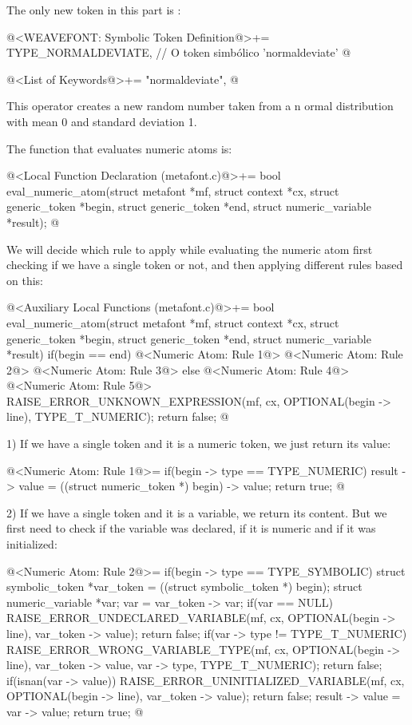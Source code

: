 The only new token in this part is :

\iniciocodigo
@<WEAVEFONT: Symbolic Token Definition@>+=
TYPE_NORMALDEVIATE,   // O token simbólico 'normaldeviate'
@
\fimcodigo

\iniciocodigo
@<List of Keywords@>+=
"normaldeviate",
@
\fimcodigo

This operator creates a new random number taken from a n ormal
distribution with mean 0 and standard deviation 1.

The function that evaluates numeric atoms is:

\iniciocodigo
@<Local Function Declaration (metafont.c)@>+=
bool eval_numeric_atom(struct metafont *mf, struct context *cx,
                       struct generic_token *begin,
                       struct generic_token *end,
                       struct numeric_variable *result);
@
\fimcodigo

We will decide which rule to apply while evaluating the numeric atom
first checking if we have a single token or not, and then applying
different rules based on this:

\iniciocodigo
@<Auxiliary Local Functions (metafont.c)@>+=
bool eval_numeric_atom(struct metafont *mf, struct context *cx,
                       struct generic_token *begin,
                       struct generic_token *end,
                       struct numeric_variable *result){
  if(begin == end){
    @<Numeric Atom: Rule 1@>
    @<Numeric Atom: Rule 2@>
    @<Numeric Atom: Rule 3@>
  }
  else{
    @<Numeric Atom: Rule 4@>
    @<Numeric Atom: Rule 5@>
  }
  RAISE_ERROR_UNKNOWN_EXPRESSION(mf, cx, OPTIONAL(begin -> line),
                                 TYPE_T_NUMERIC);
  return false;
}
@

1) If we have a single token and it is a numeric token, we just return
its value:

\iniciocodigo
@<Numeric Atom: Rule 1@>=
if(begin -> type == TYPE_NUMERIC){
  result -> value = ((struct numeric_token *) begin) -> value;
  return true;
}
@
\fimcodigo

2) If we have a single token and it is a variable, we return its
content. But we first need to check if the variable was declared, if
it is numeric and if it was initialized:

\iniciocodigo
@<Numeric Atom: Rule 2@>=
if(begin -> type == TYPE_SYMBOLIC){
  struct symbolic_token *var_token = ((struct symbolic_token *) begin);
  struct numeric_variable *var;
  var = var_token -> var;
  if(var == NULL){
    RAISE_ERROR_UNDECLARED_VARIABLE(mf, cx, OPTIONAL(begin -> line),
                                   var_token -> value);
    return false;
  }
  if(var -> type != TYPE_T_NUMERIC){
    RAISE_ERROR_WRONG_VARIABLE_TYPE(mf, cx, OPTIONAL(begin -> line),
                                   var_token -> value, var -> type,
                                   TYPE_T_NUMERIC);
    return false;
  }
  if(isnan(var -> value)){
    RAISE_ERROR_UNINITIALIZED_VARIABLE(mf, cx, OPTIONAL(begin -> line),
                                      var_token -> value);
    return false;
  }
  result -> value = var -> value;
  return true;
}
@
\fimcodigo

